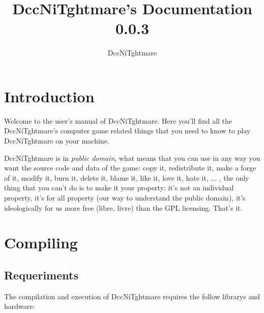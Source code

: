 \documentclass[ letterpaper,12pt]{article}
\begin{document}
\title{\textbf{DccNiTghtmare's Documentation 0.0.3}}

\author{
DccNiTghtmare
}

\maketitle




\newpage

\tableofcontents

\newpage

\section{Introduction}

Welcome to the user's manual of DccNiTghtmare. Here you'll find all the DccNiTghtmare's computer game related things that you need to know to play DccNiTghtmare on your machine. 

DccNiTghtmare is in {\it public domain}, what means that you can use in any way you want the source code and data of the game: copy it, redistribute it, make a forge of it, modify it, burn it, delete it, blame it, like it, love it, hate it, ... , the only thing that you can't do is to make it your property: it's not an individual property, it's for all property (our way to understand the public domain), it's ideologically for us more free (libre, livre) than the GPL licensing. That's it.

\section{Compiling}

\subsection{Requeriments}

The compilation and execution of DccNiTghtmare requires the follow librarys and hardware:
\end{document}

